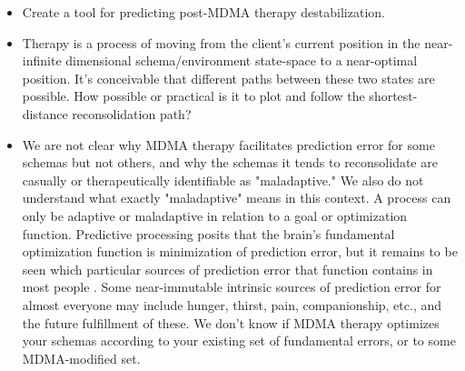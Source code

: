 \documentclass[12pt,letterpaper]{book}
\begin{document}
\begin{itemize}
    \item Create a tool for predicting post-MDMA therapy destabilization.
    \item Therapy is a process of moving from the client's current position in the near-infinite dimensional schema/environment state-space to a near-optimal position. It's conceivable that different paths between these two states are possible. How possible or practical is it to plot and follow the shortest-distance reconsolidation path?
    \item We are not clear why MDMA therapy facilitates prediction error for some schemas but not others, and why the schemas it tends to reconsolidate are casually or therapeutically identifiable as "maladaptive." We also do not understand what exactly "maladaptive" means in this context. A process can only be adaptive or maladaptive in relation to a goal or optimization function. Predictive processing posits that the brain's fundamental optimization function is minimization of prediction error, but it remains to be seen which particular sources of prediction error that function contains in most people \cite{clark2015surfing}. Some near-immutable intrinsic sources of prediction error for almost everyone may include hunger, thirst, pain, companionship, etc., and the future fulfillment of these. We don't know if MDMA therapy optimizes your schemas according to your existing set of fundamental errors, or to some MDMA-modified set.
\end{itemize}
\backmatter
\printbibliography
{}
\end{document}
